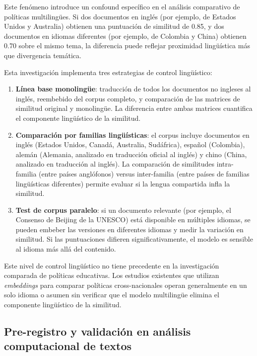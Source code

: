 Este fenómeno introduce un confound específico en el análisis comparativo de políticas multilingües. Si dos documentos en inglés (por ejemplo, de Estados Unidos y Australia) obtienen una puntuación de similitud de 0.85, y dos documentos en idiomas diferentes (por ejemplo, de Colombia y China) obtienen 0.70 sobre el mismo tema, la diferencia puede reflejar proximidad lingüística más que divergencia temática.

Esta investigación implementa tres estrategias de control lingüístico:

\begin{enumerate}
  \item \textbf{Línea base monolingüe}: traducción de todos los documentos no ingleses al inglés, reembebido del corpus completo, y comparación de las matrices de similitud original y monolingüe. La diferencia entre ambas matrices cuantifica el componente lingüístico de la similitud.

  \item \textbf{Comparación por familias lingüísticas}: el corpus incluye documentos en inglés (Estados Unidos, Canadá, Australia, Sudáfrica), español (Colombia), alemán (Alemania, analizado en traducción oficial al inglés) y chino (China, analizado en traducción al inglés). La comparación de similitudes intra-familia (entre países anglófonos) versus inter-familia (entre países de familias lingüísticas diferentes) permite evaluar si la lengua compartida infla la similitud.

  \item \textbf{Test de corpus paralelo}: si un documento relevante (por ejemplo, el Consenso de Beijing de la UNESCO) está disponible en múltiples idiomas, se pueden embeber las versiones en diferentes idiomas y medir la variación en similitud. Si las puntuaciones difieren significativamente, el modelo es sensible al idioma más allá del contenido.
\end{enumerate}

Este nivel de control lingüístico no tiene precedente en la investigación comparada de políticas educativas. Los estudios existentes que utilizan \textit{embeddings} para comparar políticas cross-nacionales operan generalmente en un solo idioma o asumen sin verificar que el modelo multilingüe elimina el componente lingüístico de la similitud.


\subsection{Pre-registro y validación en análisis computacional de textos}

